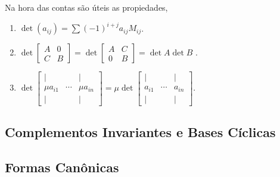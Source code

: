 \begin{note}
    Na hora das contas são úteis as propiedades,
    \begin{enumerate}[label = \roman*.]
        \item \(\det (a_{ij}) = \sum (-1)^{i+j} a_{ij} M_{ij}\). 
        \item  {\small\( \det \begin{bmatrix}
            A & 0 \\ 
            C & B
        \end{bmatrix} = \det \begin{bmatrix}
            A & C \\ 
            0 & B
        \end{bmatrix} = \det A \det B\) }.  
        \item {\small \(\det\begin{bmatrix}
        | &  & | \\ 
        \mu a_{i1} & \cdots & \mu a_{in}\\
        | &  & |
        \end{bmatrix} = \mu \det \begin{bmatrix}
        | &  & | \\ 
        a_{i1} & \cdots & a_{in}\\
        | &  & |
        \end{bmatrix}\)}. 
    \end{enumerate}
\end{note}

\subsection{Complementos Invariantes e Bases Cíclicas}

\subsection{Formas Canônicas}

